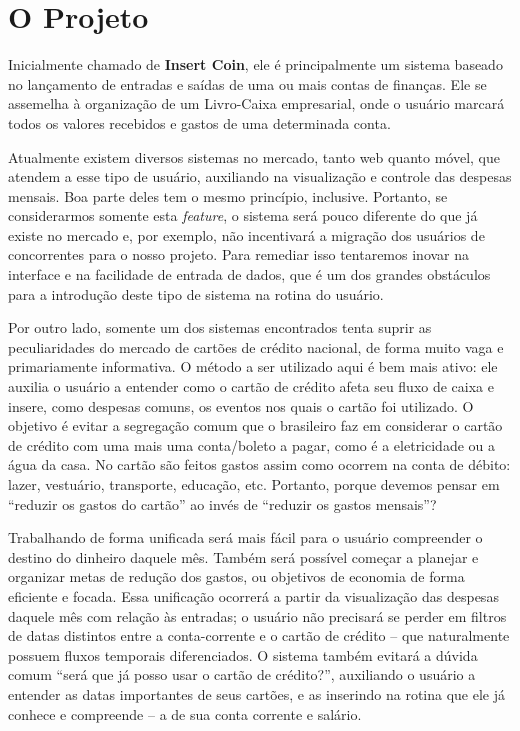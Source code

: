 \documentclass[a4paper,article]{abnt}
\begin{document}
\section*{O Projeto}

Inicialmente chamado de \textbf{Insert Coin}, ele é principalmente um sistema baseado no lançamento de entradas e saídas de uma ou mais contas de finanças. Ele se assemelha à organização de um Livro-Caixa empresarial, onde o usuário marcará todos os valores recebidos e gastos de uma determinada conta. 

Atualmente existem diversos sistemas no mercado, tanto web quanto móvel, que atendem a esse tipo de usuário, auxiliando na visualização e controle das despesas mensais. Boa parte deles tem o mesmo princípio, inclusive. Portanto, se considerarmos somente esta \emph{feature}, o sistema será pouco diferente do que já existe no mercado e, por exemplo, não incentivará a migração dos usuários de concorrentes para o nosso projeto. Para remediar isso tentaremos inovar na interface e na facilidade de entrada de dados, que é um dos grandes obstáculos para a introdução deste tipo de sistema na rotina do usuário.

Por outro lado, somente um dos sistemas encontrados tenta suprir as peculiaridades do mercado de cartões de crédito nacional, de forma muito vaga e primariamente informativa. O método a ser utilizado aqui é bem mais ativo: ele auxilia o usuário a entender como o cartão de crédito afeta seu fluxo de caixa e insere, como despesas comuns, os eventos nos quais o cartão foi utilizado. O objetivo é evitar a segregação comum que o brasileiro faz em considerar o cartão de crédito com uma mais uma conta/boleto a pagar, como é a eletricidade ou a água da casa. No cartão são feitos gastos assim como ocorrem na conta de débito: lazer, vestuário, transporte, educação, etc. Portanto, porque devemos pensar em ``reduzir os gastos do cartão'' ao invés de ``reduzir os gastos mensais''?

Trabalhando de forma unificada será mais fácil para o usuário compreender o destino do dinheiro daquele mês. Também será possível começar a planejar e organizar metas de redução dos gastos, ou objetivos de economia de forma eficiente e focada. Essa unificação ocorrerá a partir da visualização das despesas daquele mês com relação às entradas; o usuário não precisará se perder em filtros de datas distintos entre a conta-corrente e o cartão de crédito -- que naturalmente possuem fluxos temporais diferenciados. O sistema também evitará a dúvida comum ``será que já posso usar o cartão de crédito?'', auxiliando o usuário a entender as datas importantes de seus cartões, e as inserindo na rotina que ele já conhece e compreende -- a de sua conta corrente e salário.
\end{document}
